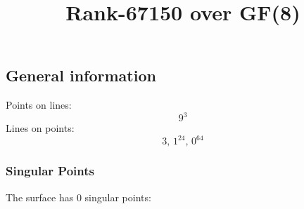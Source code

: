 \documentclass{article}
\newcommand\setTBstruts{\def\T{\rule{0pt}{2.6ex}}%
\def\B{\rule[-1.2ex]{0pt}{0pt}}}
\begin{document}
 
\setTBstruts



{\allowdisplaybreaks%






\title{Rank-67150 over GF(8)}
\author{}%
\maketitle%
%
{}



\subsection*{General information}
Points on lines:
$$
9^3$$
Lines on points:
$$
3,\,1^{24},\,0^{64}$$
\subsubsection*{Singular Points}
The surface has 0 singular points:\\
\begin{align*}
\end{align*}
}
\end{document}
